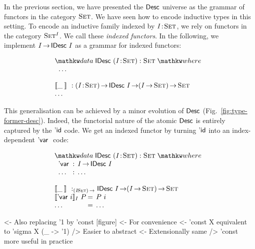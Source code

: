 In the previous section, we have presented the $\Desc$ universe as the
grammar of functors in the category $\Set$. We have seen how to encode
inductive types in this setting. To encode an inductive family indexed
by $\Bhab{\V{I}}{\Set}$, we rely on functors in the category
$\Set^I$. We call these \emph{indexed functors}. 
In the following, we
implement $I \To \IDesc{I}$ as a grammar for indexed functors:

\[\stk{
\data \IDesc{} (\Bhab{\V{I}}{\Set}) : \Set \where \\
\;\;\ldots \\
\\
\idescop{\_\:}{}{} : \PI{\V{I}}{\Set} \IDesc{I} \To (\V{I} \To \Set) \To \Set    \\
\ldots
}\]

This generalisation can be achieved by a minor evolution of $\Desc$
(Fig.~\ref{fig:type-former-desc}). Indeed, the functorial nature of the
atomic $\Desc$ is entirely captured by the $\DId$ code. We get an indexed
functor by turning $\DId$ into an index-dependent $\DVar$ code:

\[\stk{
\data \IDesc{} (\Bhab{\V{I}}{\Set}) : \Set \where \\
\;\;\begin{array}{@{}l@{\::\:\:}l@{\quad}l}
    \DVar{}         & I \To \IDesc{I}                                   \\
    \ldots          & \ldots
\end{array} \\
\\
\idescop{\_\:}{}{} :_{\PI{\V{I}}{\Set}} \IDesc{I} \To (\V{I} \To \Set) \To \Set        \\
\begin{array}{@{}l@{\:=\:\:}ll}
\idescop{\DVar{i}}{I}{P}      &  P~i                                                 \\
\ldots                        &  \ldots
\end{array}
}\]

\begin{wstructure}
<- Also replacing '1 by 'const  [figure]
    <- For convenience
        <- 'const X equivalent to 'sigma X (\_ -> '1)
        /> Easier to abstract
            <- Extensionally same
            /> 'const more useful in practice
\end{wstructure}


